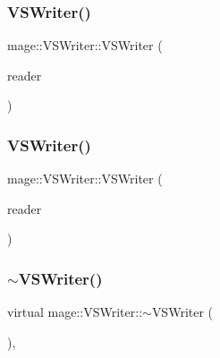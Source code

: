 \subsubsection{\texorpdfstring{V\+S\+Writer()}{VSWriter()}\hspace{0.1cm}{\footnotesize\ttfamily [2/3]}}
{\footnotesize\ttfamily mage\+::\+V\+S\+Writer\+::\+V\+S\+Writer (\begin{DoxyParamCaption}\item[{const \hyperlink{classmage_1_1_v_s_writer}{V\+S\+Writer} \&}]{reader }\end{DoxyParamCaption})\hspace{0.3cm}{\ttfamily [delete]}}

\hypertarget{classmage_1_1_v_s_writer_a0ea80ce74f51eb63512b0fa13577bf30}{}\label{classmage_1_1_v_s_writer_a0ea80ce74f51eb63512b0fa13577bf30} 
\subsubsection{\texorpdfstring{V\+S\+Writer()}{VSWriter()}\hspace{0.1cm}{\footnotesize\ttfamily [3/3]}}
{\footnotesize\ttfamily mage\+::\+V\+S\+Writer\+::\+V\+S\+Writer (\begin{DoxyParamCaption}\item[{\hyperlink{classmage_1_1_v_s_writer}{V\+S\+Writer} \&\&}]{reader }\end{DoxyParamCaption})\hspace{0.3cm}{\ttfamily [delete]}}

\hypertarget{classmage_1_1_v_s_writer_ac2268dde1a58f0d1d657e584e33e82fe}{}\label{classmage_1_1_v_s_writer_ac2268dde1a58f0d1d657e584e33e82fe} 
\subsubsection{\texorpdfstring{$\sim$\+V\+S\+Writer()}{~VSWriter()}}
{\footnotesize\ttfamily virtual mage\+::\+V\+S\+Writer\+::$\sim$\+V\+S\+Writer (\begin{DoxyParamCaption}{ }\end{DoxyParamCaption})\hspace{0.3cm}{\ttfamily [virtual]}, {\ttfamily [default]}}



